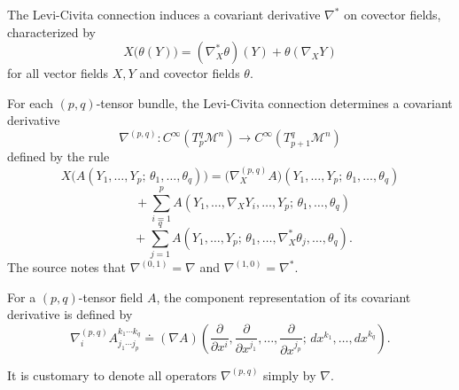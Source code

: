 \begin{definition}
\label{appa-def-covariant-derivative-covector}
The Levi-Civita connection induces a covariant derivative \(\nabla^*\) on covector fields, characterized by
\[
X\bigl(\theta(Y)\bigr) = (\nabla_X^*\theta)(Y) + \theta(\nabla_X Y)
\]
for all vector fields \(X,Y\) and covector fields \(\theta\).
\end{definition}

\begin{definition}
\label{appa-def-covariant-derivative-general-tensor}
For each \((p,q)\)-tensor bundle, the Levi-Civita connection determines a covariant derivative
\[
\nabla^{(p,q)} : C^\infty\!\left(T_p^q \mathcal M^n\right) \to C^\infty\!\left(T_{p+1}^q \mathcal M^n\right)
\]
defined by the rule
\[
X\bigl(A(Y_1,\ldots,Y_p;\,\theta_1,\ldots,\theta_q)\bigr)
= \bigl(\nabla_X^{(p,q)}A\bigr)(Y_1,\ldots,Y_p;\,\theta_1,\ldots,\theta_q)
\]
\[
\qquad + \sum_{i=1}^p A(Y_1,\ldots,\nabla_X Y_i,\ldots,Y_p;\,\theta_1,\ldots,\theta_q)
\]
\[
\qquad + \sum_{j=1}^q A(Y_1,\ldots,Y_p;\,\theta_1,\ldots,\nabla_X^*\theta_j,\ldots,\theta_q).
\]
The source notes that \(\nabla^{(0,1)}=\nabla\) and \(\nabla^{(1,0)}=\nabla^*\).
\end{definition}

\begin{definition}
\label{appa-def-component-representation-covariant-derivative}
For a \((p,q)\)-tensor field \(A\), the component representation of its covariant derivative is defined by
\[
\nabla_i^{(p,q)} A^{k_1\cdots k_q}_{j_1\cdots j_p}
\doteq
(\nabla A)\!\left(\frac{\partial}{\partial x^i}, \frac{\partial}{\partial x^{j_1}}, \ldots, \frac{\partial}{\partial x^{j_p}};\, dx^{k_1}, \ldots, dx^{k_q}\right).
\]
\end{definition}

\begin{remark}
\label{appa-rem-abuse-notation-covariant-derivatives}
It is customary to denote all operators \(\nabla^{(p,q)}\) simply by \(\nabla\).
\end{remark}


